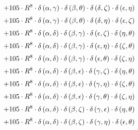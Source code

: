 \begin{subequations}
\begin{gather}
 \\[0.2em] \notag 		 + 105 \cdot R^{8} \cdot \delta{}\left(\alpha{}, \gamma{}\right) \cdot \delta{}\left(\beta{}, \theta{}\right) \cdot \delta{}\left(\delta{}, \zeta{}\right) \cdot \delta{}\left(\epsilon{}, \eta{}\right) 
 \\[0.2em] \notag 		 + 105 \cdot R^{8} \cdot \delta{}\left(\alpha{}, \gamma{}\right) \cdot \delta{}\left(\beta{}, \theta{}\right) \cdot \delta{}\left(\delta{}, \eta{}\right) \cdot \delta{}\left(\epsilon{}, \zeta{}\right) 
 \\[0.2em] \notag 		 + 105 \cdot R^{8} \cdot \delta{}\left(\alpha{}, \delta{}\right) \cdot \delta{}\left(\beta{}, \gamma{}\right) \cdot \delta{}\left(\epsilon{}, \zeta{}\right) \cdot \delta{}\left(\eta{}, \theta{}\right) 
 \\[0.2em] \notag 		 + 105 \cdot R^{8} \cdot \delta{}\left(\alpha{}, \delta{}\right) \cdot \delta{}\left(\beta{}, \gamma{}\right) \cdot \delta{}\left(\epsilon{}, \eta{}\right) \cdot \delta{}\left(\zeta{}, \theta{}\right) 
 \\[0.2em] \notag 		 + 105 \cdot R^{8} \cdot \delta{}\left(\alpha{}, \delta{}\right) \cdot \delta{}\left(\beta{}, \gamma{}\right) \cdot \delta{}\left(\epsilon{}, \theta{}\right) \cdot \delta{}\left(\zeta{}, \eta{}\right) 
 \\[0.2em] \notag 		 + 105 \cdot R^{8} \cdot \delta{}\left(\alpha{}, \delta{}\right) \cdot \delta{}\left(\beta{}, \epsilon{}\right) \cdot \delta{}\left(\gamma{}, \zeta{}\right) \cdot \delta{}\left(\eta{}, \theta{}\right) 
 \\[0.2em] \notag 		 + 105 \cdot R^{8} \cdot \delta{}\left(\alpha{}, \delta{}\right) \cdot \delta{}\left(\beta{}, \epsilon{}\right) \cdot \delta{}\left(\gamma{}, \eta{}\right) \cdot \delta{}\left(\zeta{}, \theta{}\right) 
 \\[0.2em] \notag 		 + 105 \cdot R^{8} \cdot \delta{}\left(\alpha{}, \delta{}\right) \cdot \delta{}\left(\beta{}, \epsilon{}\right) \cdot \delta{}\left(\gamma{}, \theta{}\right) \cdot \delta{}\left(\zeta{}, \eta{}\right) 
 \\[0.2em] \notag 		 + 105 \cdot R^{8} \cdot \delta{}\left(\alpha{}, \delta{}\right) \cdot \delta{}\left(\beta{}, \zeta{}\right) \cdot \delta{}\left(\gamma{}, \epsilon{}\right) \cdot \delta{}\left(\eta{}, \theta{}\right) 
 \\[0.2em] \notag 		 + 105 \cdot R^{8} \cdot \delta{}\left(\alpha{}, \delta{}\right) \cdot \delta{}\left(\beta{}, \zeta{}\right) \cdot \delta{}\left(\gamma{}, \eta{}\right) \cdot \delta{}\left(\epsilon{}, \theta{}\right) 

\end{gather}
\end{subequations}
